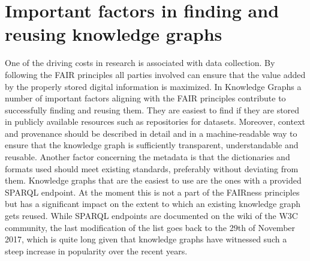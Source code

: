 \documentclass[11pt]{article}
\begin{document}
\section{Important factors in finding and reusing knowledge graphs}
One of the driving costs in research is associated with data collection. By following the FAIR principles all parties involved can ensure that the value added by the properly stored digital information is maximized. In Knowledge Graphs a number of important factors aligning with the FAIR principles contribute to successfully finding and reusing them. They are easiest to find if they are stored in publicly available resources such as repositories for datasets. Moreover, context and provenance should be described in detail and in a machine-readable way to ensure that the knowledge graph is sufficiently transparent, understandable and reusable. Another factor concerning the metadata is that the dictionaries and formats used should meet existing standards, preferably without deviating from them. Knowledge graphs that are the easiest to use are the ones with a provided SPARQL endpoint. At the moment this is not a part of the FAIRness principles but has a significant impact on the extent to which an existing knowledge graph gets reused. While SPARQL endpoints are documented on the wiki of the W3C community, the last modification of the list goes back to the 29th of November 2017, which is quite long given that knowledge graphs have witnessed such a steep increase in popularity over the recent years.
\end{document}
